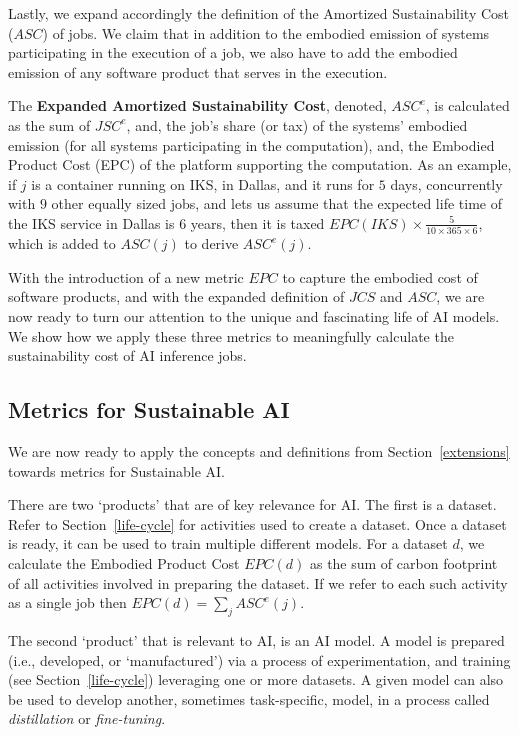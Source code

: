 {{        Lastly, we expand accordingly the definition of the Amortized Sustainability Cost ($ASC$) of jobs. We claim that in addition to the embodied emission of systems participating in the execution of a job, we also have to add the embodied emission of any software product that serves in the execution.

        The \textbf{Expanded Amortized Sustainability Cost}, denoted, $ASC^{e}$, is calculated as the sum of $JSC^{e}$, and, the job’s share (or tax) of the systems' embodied emission (for all systems participating in the computation), and, the Embodied Product Cost (EPC) of the platform supporting the computation. As an example, if $j$ is a container running on IKS, in Dallas, and it runs for $5$ days, concurrently with $9$ other equally sized jobs, and lets us assume that the expected life time of the IKS service in Dallas is $6$ years, then it is taxed $EPC \! \left ( IKS \right ) \times \frac{5}{10 \times 365 \times 6}$, which is added to $ASC \! \left ( j \right )$ to derive $ASC^{e} \! \left ( j \right )$.

        With the introduction of a new metric $EPC$ to capture the embodied cost of software products, and with the expanded definition of $JCS$ and $ASC$, we are now ready to turn our attention to the unique and fascinating life of AI models. We show how we apply these three metrics to meaningfully calculate the sustainability cost of AI inference jobs.
    }

    \subsection{Metrics for Sustainable AI}
    {
        \label{application}

        We are now ready to apply the concepts and definitions from Section~\ref{extensions} towards metrics for Sustainable AI.

        There are two `products' that are of key relevance for AI. The first is a dataset. Refer to Section~\ref{life-cycle} for activities used to create a dataset. Once a dataset is ready, it can be used to train multiple different models. For a dataset $d$, we calculate the Embodied Product Cost $EPC \! \left ( d \right )$ as the sum of carbon footprint of all activities involved in preparing the dataset. If we refer to each such activity as a single job then $EPC \! \left ( d \right ) = \sum_{j} ASC^{e} \! \left ( j \right )$.

        The second `product' that is relevant to AI, is an AI model. A model is prepared (i.e., developed, or `manufactured') via a process of experimentation, and training (see Section~\ref{life-cycle}) leveraging one or more datasets. A given model can also be used to develop another, sometimes task-specific, model, in a process called \textit{distillation} or \textit{fine-tuning}.

}}
